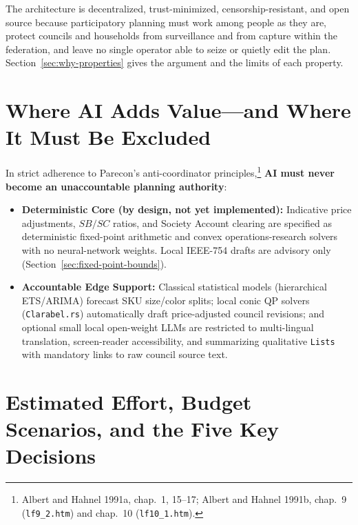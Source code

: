 \documentclass[10pt,twoside,openany]{book}
\theoremstyle{dpepstyle}
\begin{document}
The architecture is decentralized, trust-minimized, censorship-resistant, and open source because participatory planning must work among people as they are, protect councils and households from surveillance and from capture within the federation, and leave no single operator able to seize or quietly edit the plan. Section~\ref{sec:why-properties} gives the argument and the limits of each property.

\section{Where AI Adds Value---and Where It Must Be Excluded}

In strict adherence to Parecon's anti-coordinator principles,\footnote{Albert and Hahnel 1991a, chap.~1, 15--17; Albert and Hahnel 1991b, chap.~9 (\texttt{lf9\_2.htm}) and chap.~10 (\texttt{lf10\_1.htm}).} \textbf{AI must never become an unaccountable planning authority}:
\begin{itemize}[leftmargin=1.6em,itemsep=2pt]
  \item \textbf{Deterministic Core (by design, not yet implemented):} Indicative price adjustments, $SB/SC$ ratios, and Society Account clearing are specified as deterministic fixed-point arithmetic and convex operations-research solvers with no neural-network weights. Local IEEE-754 drafts are advisory only (Section~\ref{sec:fixed-point-bounds}).
  \item \textbf{Accountable Edge Support:} Classical statistical models (hierarchical ETS/ARIMA) forecast SKU size/color splits; local conic QP solvers (\texttt{Clarabel.rs}) automatically draft price-adjusted council revisions; and optional small local open-weight LLMs are restricted to multi-lingual translation, screen-reader accessibility, and summarizing qualitative \texttt{Lists} with mandatory links to raw council source text.
\end{itemize}

\section{Estimated Effort, Budget Scenarios, and the Five Key Decisions}
\end{document}
